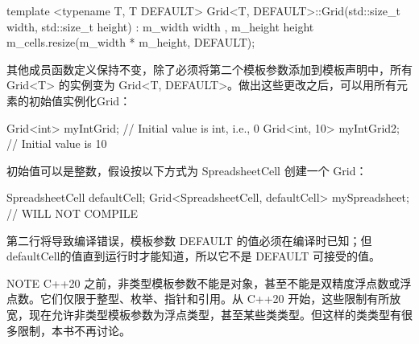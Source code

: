 \begin{cpp}
template <typename T, T DEFAULT>
Grid<T, DEFAULT>::Grid(std::size_t width, std::size_t height)
    : m_width { width }, m_height { height }
{
    m_cells.resize(m_width * m_height, DEFAULT);
}
\end{cpp}

其他成员函数定义保持不变，除了必须将第二个模板参数添加到模板声明中，所有 Grid<T> 的实例变为 Grid<T, DEFAULT>。做出这些更改之后，可以用所有元素的初始值实例化Grid：

\begin{cpp}
Grid<int> myIntGrid; // Initial value is int{}, i.e., 0
Grid<int, 10> myIntGrid2; // Initial value is 10
\end{cpp}

初始值可以是整数，假设按以下方式为 SpreadsheetCell 创建一个 Grid：

\begin{cpp}
SpreadsheetCell defaultCell;
Grid<SpreadsheetCell, defaultCell> mySpreadsheet; // WILL NOT COMPILE
\end{cpp}

第二行将导致编译错误，模板参数 DEFAULT 的值必须在编译时已知；但defaultCell的值直到运行时才能知道，所以它不是 DEFAULT 可接受的值。

\begin{myNotic}{NOTE}
C++20 之前，非类型模板参数不能是对象，甚至不能是双精度浮点数或浮点数。它们仅限于整型、枚举、指针和引用。从 C++20 开始，这些限制有所放宽，现在允许非类型模板参数为浮点类型，甚至某些类类型。但这样的类类型有很多限制，本书不再讨论。
\end{myNotic}





























